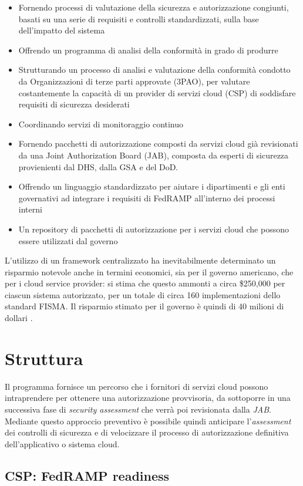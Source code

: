 \documentclass[../main.tex]{subfiles}
\begin{document}
\begin{itemize}
    \item Fornendo processi di valutazione della sicurezza e autorizzazione congiunti, basati su una serie di requisiti e controlli standardizzati, sulla base dell'impatto del sistema 
    \item Offrendo un programma di analisi della conformità in grado di produrre
    \item Strutturando un processo di analisi e valutazione della conformità condotto da Organizzazioni di terze parti approvate (3PAO), per valutare costantemente la capacità di un provider di servizi cloud (CSP) di soddisfare requisiti di sicurezza desiderati
    \item Coordinando servizi di monitoraggio continuo
    \item Fornendo pacchetti di autorizzazione composti da servizi cloud già revisionati da una Joint Authorization Board (JAB), composta da esperti di sicurezza provienienti dal DHS, dalla GSA e del DoD. 
    \item Offrendo un linguaggio standardizzato per aiutare i dipartimenti e gli enti governativi ad integrare i requisiti di FedRAMP all'interno dei processi interni
    \item Un repository di pacchetti di autorizzazione per i servizi cloud che possono essere utilizzati dal governo
\end{itemize}

L'utilizzo di un framework centralizzato ha inevitabilmente determinato un risparmio notevole anche in termini economici, sia per il governo americano, che per i cloud service provider: si stima che questo ammonti a circa \$250,000 per ciascun sistema autorizzato, per un totale di circa 160 implementazioni dello standard FISMA. Il risparmio stimato per il governo è quindi di 40 milioni di dollari \cite{7036263}.
\section{Struttura}
Il programma fornisce un percorso che i fornitori di servizi cloud possono intraprendere per ottenere una autorizzazione provvisoria, da sottoporre in una successiva fase di \textit{security assessment} che verrà poi revisionata dalla \textit{JAB}.
Mediante questo approccio preventivo è possibile quindi anticipare l'\textit{assessment} dei controlli di sicurezza e di velocizzare il processo di autorizzazione definitiva dell'applicativo o sistema cloud.
\subsection{CSP: FedRAMP readiness}
\end{document}
